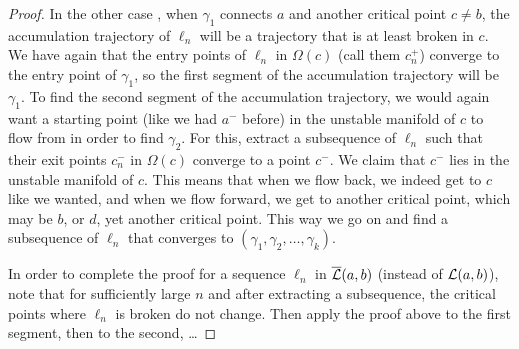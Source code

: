 \begin{proof}
    In the other case , when $\gamma_1$ connects $a$ and another critical point $c \neq b$, the accumulation trajectory of $\ell_n$ will be a trajectory that is at least broken in $c$.
We have again that the entry points of $\ell_n$ in $\Omega(c)$ (call them $c_n^{+}$) converge to the entry point of $\gamma_1$, so the first segment of the accumulation trajectory will be $\gamma_1$.
To find the second segment of the accumulation trajectory, we would again want a starting point (like we had $a^{-}$ before) in the unstable manifold of $c$ to flow from in order to find $\gamma_{2}$.
For this, extract a subsequence of $\ell_n$ such that their exit points $c^{-}_n$ in $\Omega(c)$ converge to a point $c^{-}$.
We claim that $c^{-}$ lies in the unstable manifold of $c$.
This means that when we flow back, we indeed get to $c$ like we wanted, and when we flow forward, we get to another critical point, which may be $b$, or $d$, yet another critical point. This way we go on and find a subsequence of $\ell_n$ that converges to $(\gamma_1, \gamma_2, \ldots, \gamma_k)$.

In order to complete the proof for a sequence $\ell_n$ in $ \overline{\mathcal L}(a, b)$ (instead of $\mathcal L(a, b)$), note that for sufficiently large $n$ and after extracting a subsequence, the critical points where $ \ell_n$ is broken do not change. Then apply the proof above to the first segment, then to the second, \ldots
\end{proof}



